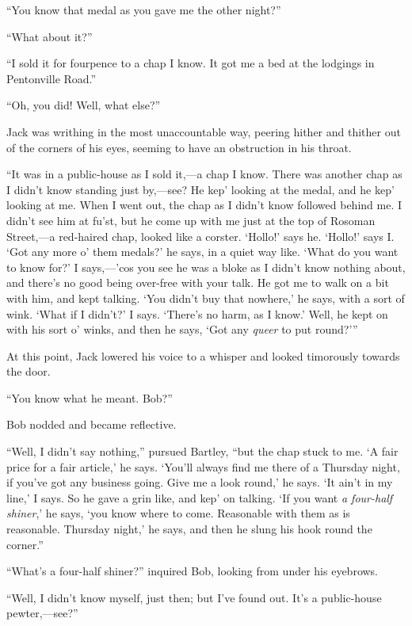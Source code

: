 ``You know that medal as you gave me the other night?''

``What about it?''

``I sold it for fourpence to a chap I know. It got me a bed at the
lodgings in Pentonville Road.''

``Oh, you did! Well, what else?''

Jack was writhing in the most unaccountable way, peering hither and
thither out of the corners of his eyes, seeming to have an obstruction
in his throat.

``It was in a public-house as I sold it,---a chap I know. There was
another chap as I didn't know standing just by,---see? He kep' looking
at the medal, and he kep' looking at me. When I went out, the chap as I
didn't know followed behind me. I didn't see him at fu'st, but he come
up with me just at the top of Rosoman Street,---a red-haired chap,
looked like a corster. `Hollo!' says he. `Hollo!' says I. `Got any more
o' them {\protect\hypertarget{233}{}{}}medals?' he says, in a quiet way
like. `What do you want to know for?' I says,---'cos you see he was a
bloke as I didn't know nothing about, and there's no good being
over-free with your talk. He got me to walk on a bit with him, and kept
talking. `You didn't buy that nowhere,' he says, with a sort of wink.
`What if I didn't?' I says. `There's no harm, as I know.' Well, he kept
on with his sort o' winks, and then he says, `Got any \emph{queer} to
put round?'''

At this point, Jack lowered his voice to a whisper and looked timorously
towards the door.

``You know what he meant. Bob?''

Bob nodded and became reflective.

``Well, I didn't say nothing,'' pursued Bartley, ``but the chap stuck to
me. `A fair price for a fair article,' he says. `You'll always find me
there of a Thursday night, if you've got any business going. Give me a
look round,' he says. `It ain't in my line,' I says. So he gave a grin
like, and kep' on talking. `If you want \emph{a four-half shiner},' he
says, `you {\protect\hypertarget{234}{}{}}know where to come. Reasonable
with them as is reasonable. Thursday night,' he says, and then he slung
his hook round the corner.''

``What's a four-half shiner?'' inquired Bob, looking from under his
eyebrows.

``Well, I didn't know myself, just then; but I've found out. It's a
public-house pewter,---see?''

